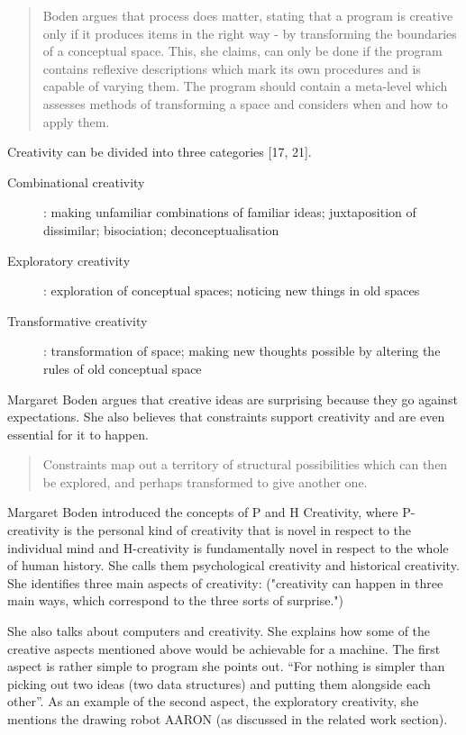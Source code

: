 \begin{quote}
  Boden argues that process does matter, stating that a program is creative only if it produces items in the right way - by transforming the boundaries of a conceptual space. This, she claims, can only be done if the program contains reflexive descriptions which mark its own procedures and is capable of varying them. The program should contain a meta-level which assesses methods of transforming a space and considers when and how to apply them. \citep[p.8]{Pease2001}
\end{quote}

Creativity can be divided into three categories \citep{Boden2003}[17, 21].

\begin{description}
  \item [Combinational creativity]: making unfamiliar combinations of familiar ideas; juxtaposition of dissimilar; bisociation; deconceptualisation
  \item [Exploratory creativity]: exploration of conceptual spaces; noticing new things in old spaces
  \item [Transformative creativity]: transformation of space; making new thoughts possible by altering the rules of old conceptual space
\end{description}

Margaret Boden \citep{Boden2003} argues that creative ideas are surprising because they go against expectations. She also believes that constraints support creativity and are even essential for it to happen.

\begin{quote}
  Constraints map out a territory of structural possibilities which can then be explored, and perhaps transformed to give another one. \citep{Boden2003}
\end{quote}

Margaret Boden \citep{Boden2003} introduced the concepts of P and H Creativity, where P-creativity is the personal kind of creativity that is novel in respect to the individual mind and H-creativity is fundamentally novel in respect to the whole of human history. She calls them psychological creativity and historical creativity. She identifies three main aspects of creativity: ("creativity can happen in three main ways, which correspond to the three sorts of surprise.")

She also talks about computers and creativity. She explains how some of the creative aspects mentioned above would be achievable for a machine.  The first aspect is rather simple to program she points out. ``For nothing is simpler than picking out two ideas (two data structures) and putting them alongside each other''. As an example of the second aspect, the exploratory creativity, she mentions the drawing robot AARON (as discussed in the related work section).

